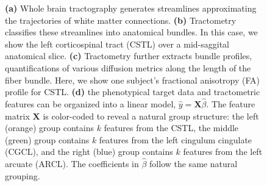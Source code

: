 \documentclass[10pt,%
               aps,%
               prl,%
               preprint,%
               superscriptaddress,%
               preprintnumbers,%
               amsmath,%
               floatfix,%
               endfloats*]{revtex4-1}
\begin{document}
\begin{figure}[!h]
{        \label{fig:methods}
        {\bf (a)} Whole brain tractography generates streamlines approximating
        the trajectories of white matter connections.
        {\bf (b)} Tractometry classifies these streamlines into anatomical bundles.
        In this case, we show the left corticospinal tract (CSTL) over a mid-saggital
        anatomical slice.
        {\bf (c)} Tractometry further extracts bundle profiles,
        quantifications of various diffusion metrics along the length of the
        fiber bundle. Here, we show one subject's fractional anisotropy (FA)
        profile for CSTL.
        {\bf (d)} the phenotypical target data and tractometric features can
        be organized into a linear model, $\hat{y} = \mathbf{X}
        \hat{\beta}$. The feature matrix $\mathbf{X}$ is color-coded
        to reveal a natural group structure: the left (orange) group
        contains $k$ features from the CSTL, the middle (green) group
        contains $k$ features from the left cingulum cingulate (CGCL),
        and the right (blue) group
        contains $k$ features from the left arcuate (ARCL). The coefficients in
        $\hat{\beta}$ follow the same natural grouping.
    }
\end{figure}
\end{document}
